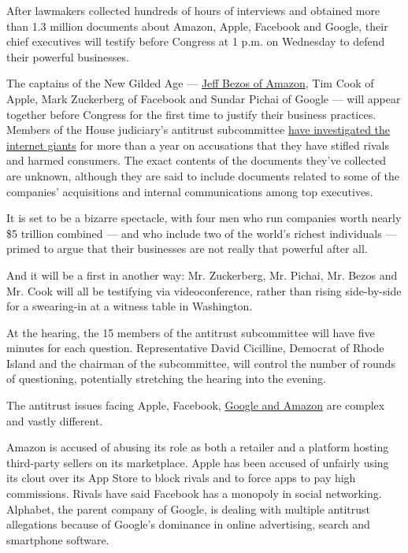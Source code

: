 After lawmakers collected hundreds of hours of interviews and obtained
more than 1.3 million documents about Amazon, Apple, Facebook and
Google, their chief executives will testify before Congress at 1 p.m. on
Wednesday to defend their powerful businesses.

The captains of the New Gilded Age ---
\href{https://www.nytimes.com/2020/07/27/business/jeff-bezos-amazon-congress.html}{Jeff
Bezos of Amazon}, Tim Cook of Apple, Mark Zuckerberg of Facebook and
Sundar Pichai of Google --- will appear together before Congress for the
first time to justify their business practices. Members of the House
judiciary's antitrust subcommittee
\href{https://www.nytimes.com/2019/06/11/technology/antitrust-hearing.html}{have
investigated the internet giants} for more than a year on accusations
that they have stifled rivals and harmed consumers. The exact contents
of the documents they've collected are unknown, although they are said
to include documents related to some of the companies' acquisitions and
internal communications among top executives.

It is set to be a bizarre spectacle, with four men who run companies
worth nearly \$5 trillion combined --- and who include two of the
world's richest individuals --- primed to argue that their businesses
are not really that powerful after all.

And it will be a first in another way: Mr. Zuckerberg, Mr. Pichai, Mr.
Bezos and Mr. Cook will all be testifying via videoconference, rather
than rising side-by-side for a swearing-in at a witness table in
Washington.

At the hearing, the 15 members of the antitrust subcommittee will have
five minutes for each question. Representative David Cicilline, Democrat
of Rhode Island and the chairman of the subcommittee, will control the
number of rounds of questioning, potentially stretching the hearing into
the evening.

The antitrust issues facing Apple, Facebook,
\href{https://www.nytimes.com/2019/06/02/business/google-antitrust-investigation.html}{Google
and Amazon} are complex and vastly different.

Amazon is accused of abusing its role as both a retailer and a platform
hosting third-party sellers on its marketplace. Apple has been accused
of unfairly using its clout over its App Store to block rivals and to
force apps to pay high commissions. Rivals have said Facebook has a
monopoly in social networking. Alphabet, the parent company of Google,
is dealing with multiple antitrust allegations because of Google's
dominance in online advertising, search and smartphone software.

